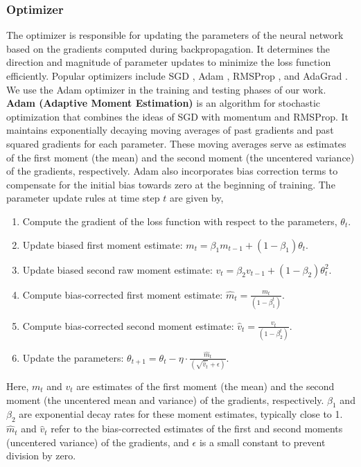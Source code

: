 \subsubsection{Optimizer} 
The optimizer is responsible for updating the parameters of the neural network based on the gradients computed during backpropagation. It determines the direction and magnitude of parameter updates to minimize the loss function efficiently. Popular optimizers include \gls{SGD} \cite{sgd}, \gls{Adam} \cite{adam}, \gls{RMSProp} \cite{rmsprop}, and \gls{AdaGrad} \cite{adagrad}. We use the Adam optimizer in the training and testing phases of our work. \\
 \textbf{Adam (Adaptive Moment Estimation)} is an algorithm for stochastic optimization that combines the ideas of SGD with momentum and RMSProp. It maintains exponentially decaying moving averages of past gradients and past squared gradients for each parameter. These moving averages serve as estimates of the first moment (the mean) and the second moment (the uncentered variance) of the gradients, respectively. Adam also incorporates bias correction terms to compensate for the initial bias towards zero at the beginning of training. The parameter update rules at time step $t$ are given by,
 \begin{enumerate}
  \item Compute the gradient of the loss function with respect to the parameters, \(\theta_t\).
  \item Update biased first moment estimate: \(m_t = \beta_1 m_{t-1} + (1 - \beta_1)\theta_t\).
  \item Update biased second raw moment estimate: \(v_t = \beta_2 v_{t-1} + (1 - \beta_2)\theta_t^2\).
  \item Compute bias-corrected first moment estimate: \(\hat{m}_t = \frac{m_t}{(1 - \beta_1^t)}\).
  \item Compute bias-corrected second moment estimate: \(\hat{v}_t = \frac{v_t}{(1 - \beta_2^t)}\).
  \item Update the parameters: \(\theta_{t+1} = \theta_t - \eta \cdot \frac{\hat{m}_t}{(\sqrt{\hat{v}_t} + \epsilon)}\).
\end{enumerate}
Here, \(m_t\) and \(v_t\) are estimates of the first moment (the mean) and the second moment (the uncentered mean and variance) of the gradients, respectively. \(\beta_1\) and \(\beta_2\) are exponential decay rates for these moment estimates, typically close to 1. $\hat{m}_t$ and $\hat{v}_t$ refer to the bias-corrected estimates of the first and second moments (uncentered variance) of the gradients, and $\epsilon$ is a small constant to prevent division by zero.
